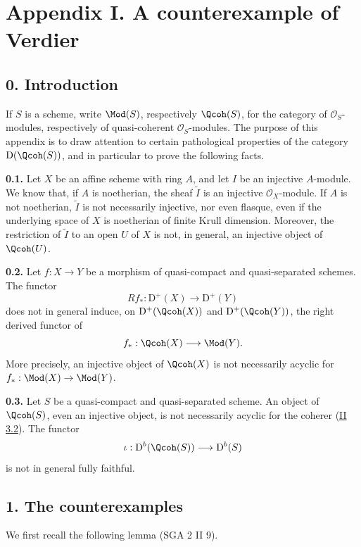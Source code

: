 \section*{Appendix I. A counterexample of Verdier}

\subsection*{0. Introduction}
If $S$ is a scheme, write $\Mod(S)$, respectively $\Qcoh(S)$, for the category of $\mathcal O_S$-modules, respectively of quasi-coherent $\mathcal O_S$-modules. The purpose of this appendix is to draw attention to certain pathological properties of the category $\mathrm D(\Qcoh(S))$, and in particular to prove the following facts.

\textbf{0.1.} Let $X$ be an affine scheme with ring $A$, and let $I$ be an injective $A$-module. We know that, if $A$ is noetherian, the sheaf $\widetilde I$ is an injective $\mathcal O_X$-module. If $A$ is not noetherian, $\widetilde I$ is not necessarily injective, nor even flasque, even if the underlying space of $X$ is noetherian of finite Krull dimension. Moreover, the restriction of $\widetilde I$ to an open $U$ of $X$ is not, in general, an injective object of $\Qcoh(U)$.

\textbf{0.2.} Let $f:X\to Y$ be a morphism of quasi-compact and quasi-separated schemes. The functor
\[
 Rf_*:\mathrm D^+(X)\longrightarrow\mathrm D^+(Y)
\]
does not in general induce, on $\mathrm D^+(\Qcoh(X))$ and $\mathrm D^+(\Qcoh(Y))$, the right derived functor of
\[
 f_*:\Qcoh(X)\longrightarrow\Mod(Y).
\]
More precisely, an injective object of $\Qcoh(X)$ is not necessarily acyclic for $f_*:\Mod(X)\to\Mod(Y)$.

\textbf{0.3.} Let $S$ be a quasi-compact and quasi-separated scheme. An object of $\Qcoh(S)$, even an injective object, is not necessarily acyclic for the coherer (\hyperlink{sga6.e02.lem.3-2}{II 3.2}). The functor
\[
 \iota:\mathrm D^b(\Qcoh(S))\longrightarrow\mathrm D^b(S)
\]
is not in general fully faithful.

\subsection*{1. The counterexamples}
We first recall the following lemma (SGA 2 II 9).

